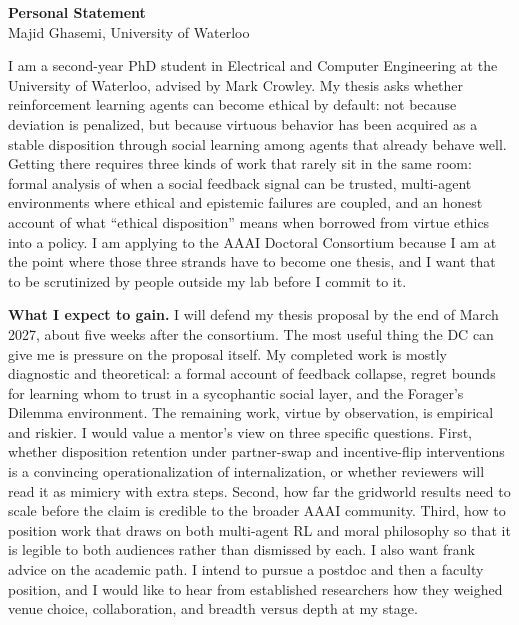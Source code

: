 \documentclass[letterpaper,11pt]{article}
\begin{document}
\begin{center}
  {\LARGE\bfseries Personal Statement}\\[0.3em]
  {\large Majid Ghasemi, University of Waterloo}
\end{center}

I am a second-year PhD student in Electrical and Computer Engineering at the University of Waterloo, advised by Mark Crowley. My thesis asks whether reinforcement learning agents can become ethical by default: not because deviation is penalized, but because virtuous behavior has been acquired as a stable disposition through social learning among agents that already behave well. Getting there requires three kinds of work that rarely sit in the same room: formal analysis of when a social feedback signal can be trusted, multi-agent environments where ethical and epistemic failures are coupled, and an honest account of what ``ethical disposition'' means when borrowed from virtue ethics into a policy. I am applying to the AAAI Doctoral Consortium because I am at the point where those three strands have to become one thesis, and I want that to be scrutinized by people outside my lab before I commit to it.

\textbf{What I expect to gain.} I will defend my thesis proposal by the end of March 2027, about five weeks after the consortium. The most useful thing the DC can give me is pressure on the proposal itself. My completed work is mostly diagnostic and theoretical: a formal account of feedback collapse, regret bounds for learning whom to trust in a sycophantic social layer, and the Forager's Dilemma environment. The remaining work, virtue by observation, is empirical and riskier. I would value a mentor's view on three specific questions. First, whether disposition retention under partner-swap and incentive-flip interventions is a convincing operationalization of internalization, or whether reviewers will read it as mimicry with extra steps. Second, how far the gridworld results need to scale before the claim is credible to the broader AAAI community. Third, how to position work that draws on both multi-agent RL and moral philosophy so that it is legible to both audiences rather than dismissed by each. I also want frank advice on the academic path. I intend to pursue a postdoc and then a faculty position, and I would like to hear from established researchers how they weighed venue choice, collaboration, and breadth versus depth at my stage.
\end{document}
